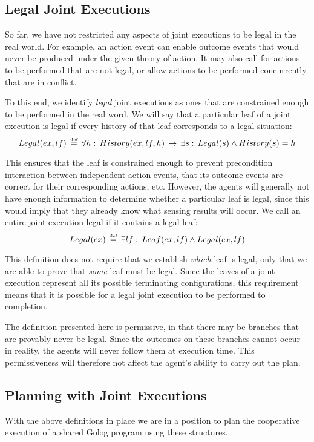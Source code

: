 \subsection{Legal Joint Executions}

So far, we have not restricted any aspects of joint executions to
be legal in the real world. For example, an action event can enable
outcome events that would never be produced under the given theory
of action. It may also call for actions to be performed that are not
legal, or allow actions to be performed concurrently that are in conflict.

To this end, we identify \emph{legal} joint executions as ones that
are constrained enough to be performed in the real word. We will say
that a particular leaf of a joint execution is legal if every history
of that leaf corresponds to a legal situation:\[
Legal(ex,lf)\,\stackrel{\mbox{\tiny def}}{=}\,\forall h:\, History(ex,lf,h)\,\rightarrow\,\exists s:\, Legal(s)\wedge History(s)=h\]


This ensures that the leaf is constrained enough to prevent precondition
interaction between independent action events, that its outcome events
are correct for their corresponding actions, etc. However, the agents
will generally not have enough information to determine whether a
particular leaf is legal, since this would imply that they already
know what sensing results will occur. We call an entire joint execution
legal if it contains a legal leaf:\[
Legal(ex)\,\stackrel{\mbox{\tiny def}}{=}\,\exists lf:\, Leaf(ex,lf)\wedge Legal(ex,lf)\]


This definition does not require that we establish \emph{which} leaf
is legal, only that we are able to prove that \emph{some} leaf must
be legal. Since the leaves of a joint execution represent all its
possible terminating configurations, this requirement means that it
is possible for a legal joint execution to be performed to completion.

The definition presented here is permissive, in that there may be
branches that are provably never be legal. Since the outcomes on these
branches cannot occur in reality, the agents will never follow them
at execution time. This permissiveness will therefore not affect the
agent's ability to carry out the plan.


\subsection{Planning with Joint Executions}

With the above definitions in place we are in a position to plan the
cooperative execution of a shared Golog program using these structures.


